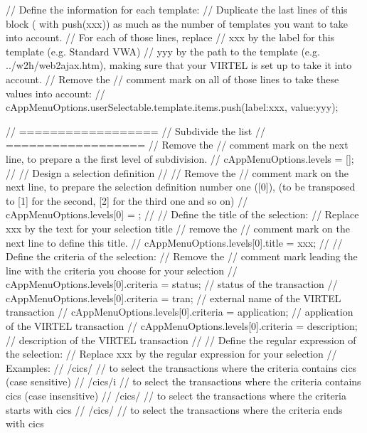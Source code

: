 \documentclass[letterpaper,10pt,english]{sphinxmanual}
\begin{document}
\begin{sphinxVerbatim}[commandchars=\\\{\}]
// \PYGZhy{} Define the information for each template:
// Duplicate the last lines of this block ( with push(\PYGZdq{}xxx\PYGZdq{})) as much as the number of templates you want to take into account.
// For each of those lines, replace
// \PYGZhy{} \PYGZdq{}xxx\PYGZdq{} by the label for this template (e.g. \PYGZdq{}Standard VWA\PYGZdq{})
// \PYGZhy{} \PYGZdq{}yyy\PYGZdq{} by the path to the template (e.g. \PYGZdq{}../w2h/web2ajax.htm\PYGZdq{}), making sure that your VIRTEL is set up to take it into account.
// Remove the // comment mark on all of those lines to take these values into account:
// cAppMenuOptions.userSelectable.template.items.push(\PYGZob{}\PYGZdq{}label\PYGZdq{}:\PYGZdq{}xxx\PYGZdq{}, \PYGZdq{}value\PYGZdq{}:\PYGZdq{}yyy\PYGZdq{}\PYGZcb{});





// ==================
// Subdivide the list
// ==================
// Remove the // comment mark on the next line, to prepare a the first level of subdivision.
// cAppMenuOptions.levels = [];
//
// Design a selection definition
// \PYGZhy{}\PYGZhy{}\PYGZhy{}\PYGZhy{}\PYGZhy{}\PYGZhy{}\PYGZhy{}\PYGZhy{}\PYGZhy{}\PYGZhy{}\PYGZhy{}\PYGZhy{}\PYGZhy{}\PYGZhy{}\PYGZhy{}\PYGZhy{}\PYGZhy{}\PYGZhy{}\PYGZhy{}\PYGZhy{}\PYGZhy{}\PYGZhy{}\PYGZhy{}\PYGZhy{}\PYGZhy{}\PYGZhy{}\PYGZhy{}\PYGZhy{}\PYGZhy{}
// Remove the // comment mark on the next line, to prepare the selection definition number one ([0]), (to be transposed to [1] for the second, [2] for the third one and so on)
// cAppMenuOptions.levels[0] = \PYGZob{}\PYGZcb{};
//
// \PYGZhy{} Define the title of the selection:
// Replace xxx by the text for your selection title
// remove the // comment mark on the next line to define this title.
// cAppMenuOptions.levels[0].title = \PYGZdq{}xxx\PYGZdq{};
//
// \PYGZhy{} Define the criteria of the selection:
// Remove the // comment mark leading the line with the criteria you choose for your selection
// cAppMenuOptions.levels[0].criteria = \PYGZdq{}status\PYGZdq{};       // status of the transaction
// cAppMenuOptions.levels[0].criteria = \PYGZdq{}tran\PYGZdq{};         // external name of the VIRTEL transaction
// cAppMenuOptions.levels[0].criteria = \PYGZdq{}application\PYGZdq{};  // application of the VIRTEL transaction
// cAppMenuOptions.levels[0].criteria = \PYGZdq{}description\PYGZdq{};  // description of the VIRTEL transaction
//
// \PYGZhy{} Define the regular expression of the selection:
// Replace xxx by the regular expression for your selection
// Examples:
//   /cics/      // to select the transactions where the criteria contains \PYGZdq{}cics\PYGZdq{} (case sensitive)
//   /cics/i     // to select the transactions where the criteria contains \PYGZdq{}cics\PYGZdq{} (case insensitive)
//   /\PYGZca{}cics/     // to select the transactions where the criteria starts with \PYGZdq{}cics\PYGZdq{}
//   /cics\PYGZdl{}/     // to select the transactions where the criteria ends with \PYGZdq{}cics\PYGZdq{}


\end{sphinxVerbatim}
\end{document}
